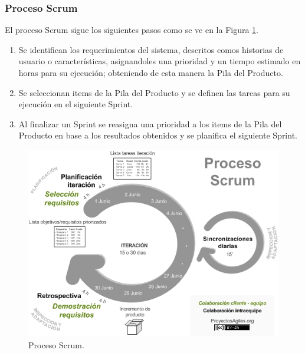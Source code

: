 \subsubsection{Proceso Scrum}
El proceso Scrum sigue los siguientes pasos como se ve en la Figura 
\ref{fig:procesoScrum}.
\begin{enumerate}
\item Se identifican los requerimientos del sistema, descritos comos historias de
usuario o caracter\'isticas, asignandoles una prioridad y un tiempo estimado en
horas para su ejecuci\'on; obteniendo de esta manera la Pila del Producto.
\item Se seleccionan items de la Pila del Producto y se definen las tareas para su
ejecuci\'on en el siguiente Sprint.
\item Al finalizar un Sprint se reasigna una prioridad a los items de la Pila del
Producto en base a los resultados obtenidos y se planifica el siguiente Sprint.
\end{enumerate}
\begin{figure}
	\begin{center}
		\includegraphics[scale=0.5]{./resources/img/proceso_scrum.jpg}
		\caption{\small Proceso Scrum.}
		\label{fig:procesoScrum}
	\end{center}
\end{figure}
